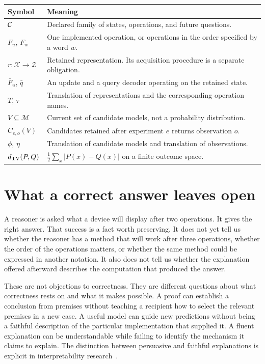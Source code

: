 \documentclass[11pt,letterpaper]{article}
\theoremstyle{plain}
\theoremstyle{definition}
\newcommand{\X}{\mathcal X}\newcommand{\Z}{\mathcal Z}
\newcommand{\M}{\mathcal M}\newcommand{\E}{\mathbb E}
\begin{document}
\begin{center}\small
\begin{tabularx}{\textwidth}{@{}lX@{}}\toprule
Symbol & Meaning\\\midrule
$\mathcal C$ & Declared family of states, operations, and future questions.\\
$F_u$, $F_w$ & One implemented operation, or operations in the order specified by a word $w$.\\
$r:\X\to\Z$ & Retained representation. Its acquisition procedure is a separate obligation.\\
$\bar F_u$, $\bar q$ & An update and a query decoder operating on the retained state.\\
$T$, $\tau$ & Translation of representations and the corresponding operation names.\\
$V\subseteq\M$ & Current set of candidate models, not a probability distribution.\\
$C_{e,o}(V)$ & Candidates retained after experiment $e$ returns observation $o$.\\
$\phi$, $\eta$ & Translation of candidate models and translation of observations.\\
$d_{\mathrm{TV}}(P,Q)$ & $\tfrac12\sum_x|P(x)-Q(x)|$ on a finite outcome space.\\\bottomrule
\end{tabularx}\end{center}
\clearpage{}

\section{What a correct answer leaves open}\label{sec:intro}
A reasoner is asked what a device will display after two operations. It gives the right answer. That success is a fact worth preserving. It does not yet tell us whether the reasoner has a method that will work after three operations, whether the order of the operations matters, or whether the same method could be expressed in another notation. It also does not tell us whether the explanation offered afterward describes the computation that produced the answer.

These are not objections to correctness. They are different questions about what correctness rests on and what it makes possible. A proof can establish a conclusion from premises without teaching a recipient how to select the relevant premises in a new case. A useful model can guide new predictions without being a faithful description of the particular implementation that supplied it. A fluent explanation can be understandable while failing to identify the mechanism it claims to explain. The distinction between persuasive and faithful explanations is explicit in interpretability research~\cite{jacovi}.
\end{document}

